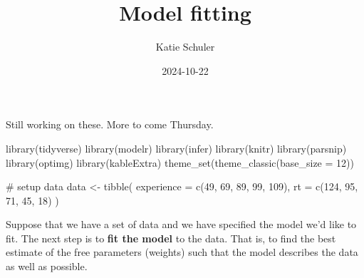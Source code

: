 \documentclass[
  letterpaper,
  DIV=11,
  numbers=noendperiod]{scrartcl}
\title{Model fitting}
\author{Katie Schuler}
\date{2024-10-22}
\newenvironment{Shaded}{}{}
\newcommand{\AttributeTok}[1]{\textcolor[rgb]{0.84,0.23,0.29}{#1}}
\newcommand{\CommentTok}[1]{\textcolor[rgb]{0.42,0.45,0.49}{#1}}
\newcommand{\DecValTok}[1]{\textcolor[rgb]{0.00,0.36,0.77}{#1}}
\newcommand{\FunctionTok}[1]{\textcolor[rgb]{0.44,0.26,0.76}{#1}}
\newcommand{\NormalTok}[1]{\textcolor[rgb]{0.14,0.16,0.18}{#1}}
\newcommand{\OtherTok}[1]{\textcolor[rgb]{0.44,0.26,0.76}{#1}}
\begin{document}
\maketitle


\begin{tcolorbox}[enhanced jigsaw, title=\textcolor{quarto-callout-warning-color}{\faExclamationTriangle}\hspace{0.5em}{Under construction}, opacitybacktitle=0.6, toprule=.15mm, bottomtitle=1mm, colbacktitle=quarto-callout-warning-color!10!white, arc=.35mm, titlerule=0mm, toptitle=1mm, breakable, coltitle=black, bottomrule=.15mm, colback=white, colframe=quarto-callout-warning-color-frame, opacityback=0, leftrule=.75mm, left=2mm, rightrule=.15mm]

Still working on these. More to come Thursday.

\end{tcolorbox}

\begin{Shaded}
\begin{Highlighting}[]
\FunctionTok{library}\NormalTok{(tidyverse)}
\FunctionTok{library}\NormalTok{(modelr)}
\FunctionTok{library}\NormalTok{(infer)}
\FunctionTok{library}\NormalTok{(knitr)}
\FunctionTok{library}\NormalTok{(parsnip)}
\FunctionTok{library}\NormalTok{(optimg)}
\FunctionTok{library}\NormalTok{(kableExtra)}
\FunctionTok{theme\_set}\NormalTok{(}\FunctionTok{theme\_classic}\NormalTok{(}\AttributeTok{base\_size =} \DecValTok{12}\NormalTok{))}

\CommentTok{\# setup data }
\NormalTok{data }\OtherTok{\textless{}{-}} \FunctionTok{tibble}\NormalTok{(}
    \AttributeTok{experience =} \FunctionTok{c}\NormalTok{(}\DecValTok{49}\NormalTok{, }\DecValTok{69}\NormalTok{, }\DecValTok{89}\NormalTok{, }\DecValTok{99}\NormalTok{, }\DecValTok{109}\NormalTok{),}
    \AttributeTok{rt =} \FunctionTok{c}\NormalTok{(}\DecValTok{124}\NormalTok{, }\DecValTok{95}\NormalTok{, }\DecValTok{71}\NormalTok{, }\DecValTok{45}\NormalTok{, }\DecValTok{18}\NormalTok{)}
\NormalTok{)}
\end{Highlighting}
\end{Shaded}

Suppose that we have a set of data and we have specified the model we'd
like to fit. The next step is to \textbf{fit the model} to the data.
That is, to find the best estimate of the free parameters (weights) such
that the model describes the data as well as possible.
\end{document}
